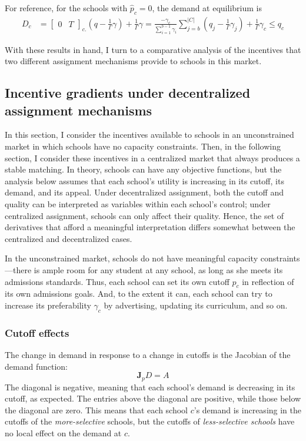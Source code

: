 \documentclass[12pt]{article}
\theoremstyle{definition}
\begin{document}
For reference, for the schools with $\hat p_c = 0$, the demand at equilibrium is 
\begin{align} \label{demand-pc-eq-zero}
D_c &=
\begin{bmatrix}
0& T
\end{bmatrix}_{c.} \left(q - \frac{1}{\Gamma}\gamma\right) + \frac{1}{\Gamma}\gamma  
= \frac{-\gamma_c}{\sum_{i=1}^{b-1} \gamma_i} \sum_{j=b}^{|C|} \left(q_j - \frac{1}{\Gamma}\gamma_j\right)  + \frac{1}{\Gamma}\gamma_c \leq q_c
\end{align}


With these results in hand, I turn to a comparative analysis of the incentives that two different assignment mechanisms provide to schools in this market.

\subsection{Incentive gradients under decentralized assignment mechanisms}
In this section, I consider the incentives available to schools in an unconstrained market in which schools have no capacity constraints. Then, in the following section, I consider these incentives in a centralized market that always produces a stable matching. In theory, schools can have any objective functions, but the analysis below assumes that each school's utility is increasing in its cutoff, its demand, and its appeal. Under decentralized assignment, both the cutoff and quality can be interpreted as variables within each school's control; under centralized assignment, schools can only affect their quality. Hence, the set of derivatives that afford a meaningful interpretation differs somewhat between the centralized and decentralized cases. 

In the unconstrained market, schools do not have meaningful capacity constraints---there is ample room for any student at any school, as long as she meets its admissions standards. Thus, each school can set its own cutoff $p_c$ in reflection of its own admissions goals. And, to the extent it can, each school can try to increase its preferability $\gamma_c$ by advertising, updating its curriculum, and so on. 

\subsubsection{Cutoff effects} \label{unconstrainedcutoffeffects}
The change in demand in response to a change in cutoffs is the Jacobian of the demand function:
\[\mathbf{J}_p D = A \]
The diagonal is negative, meaning that each school's demand is decreasing in its cutoff, as expected. The entries above the diagonal are positive, while those below the diagonal are zero. This means that each school $c$'s demand is increasing in the cutoffs of the \emph{more-selective} schools, but the cutoffs of \emph{less-selective schools} have no local effect on the demand at $c$.
\end{document}
